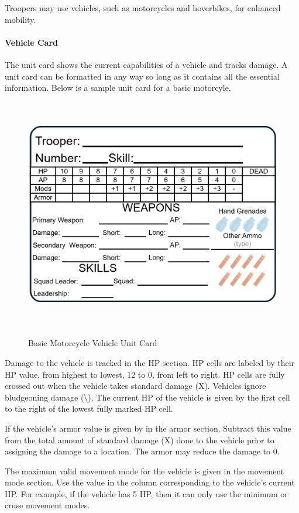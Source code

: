 Troopers may use vehicles, such as motorcycles and hoverbikes, for enhanced mobility.

\paragraph*{Vehicle Card}

The unit card shows the current capabilities of a vehicle and tracks damage.
A unit card can be formatted in any way so long as it contains all the essential information.
Below is a sample unit card for a basic motorcyle.

\begin{figure}[!h]
  \centering
  \includegraphics[alt='Sample Regular Trooper', width=5.63in, height=4in]{img/RegularTrooper.png}
  \caption*{Basic Motorcycle Vehicle Unit Card}
\end{figure}

Damage to the vehicle is tracked in the HP section.
HP cells are labeled by their HP value, from highest to lowest, 12 to 0, from left to right.
HP cells are fully crossed out when the vehicle takes standard damage (X).
Vehicles ignore bludgeoning damage (\textbackslash).
The current HP of the vehicle is given by the first cell to the right of the lowest fully marked HP cell.

If the vehicle's armor value is given by in the armor section.
Subtract this value from the total amount of standard damage (X) done to the vehicle prior to assigning the damage to a location.
The armor may reduce the damage to 0.

The maximum valid movement mode for the vehicle is given in the movement mode section.
Use the value in the column corresponding to the vehicle's current HP.
For example, if the vehicle has 5 HP, then it can only use the minimum or cruse movement modes.

